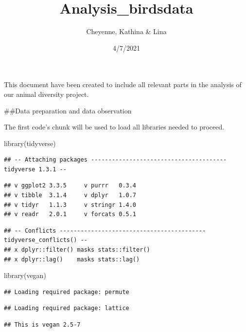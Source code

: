 \documentclass[
]{article}
\title{Analysis\_birdsdata}
\author{Cheyenne, Kathina \& Lina}
\date{4/7/2021}
\newenvironment{Shaded}{\begin{snugshade}}{\end{snugshade}}
\newcommand{\FunctionTok}[1]{\textcolor[rgb]{0.00,0.00,0.00}{#1}}
\newcommand{\NormalTok}[1]{#1}
\begin{document}
\maketitle

This document have been created to include all relevant parts in the
analysis of our animal diversity project.

\#\#Data preparation and data observation

The first code's chunk will be used to load all libraries needed to
proceed.

\begin{Shaded}
\begin{Highlighting}[]
\FunctionTok{library}\NormalTok{(tidyverse)}
\end{Highlighting}
\end{Shaded}

\begin{verbatim}
## -- Attaching packages --------------------------------------- tidyverse 1.3.1 --
\end{verbatim}

\begin{verbatim}
## v ggplot2 3.3.5     v purrr   0.3.4
## v tibble  3.1.4     v dplyr   1.0.7
## v tidyr   1.1.3     v stringr 1.4.0
## v readr   2.0.1     v forcats 0.5.1
\end{verbatim}

\begin{verbatim}
## -- Conflicts ------------------------------------------ tidyverse_conflicts() --
## x dplyr::filter() masks stats::filter()
## x dplyr::lag()    masks stats::lag()
\end{verbatim}

\begin{Shaded}
\begin{Highlighting}[]
\FunctionTok{library}\NormalTok{(vegan)}
\end{Highlighting}
\end{Shaded}

\begin{verbatim}
## Loading required package: permute
\end{verbatim}

\begin{verbatim}
## Loading required package: lattice
\end{verbatim}

\begin{verbatim}
## This is vegan 2.5-7
\end{verbatim}
\end{document}

